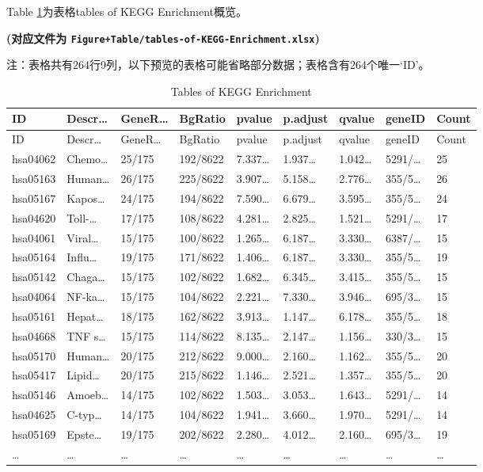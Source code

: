 \documentclass[
]{article}
\begin{document}
Table \ref{tab:tables-of-KEGG-Enrichment}为表格tables of KEGG Enrichment概览。

\textbf{(对应文件为 \texttt{Figure+Table/tables-of-KEGG-Enrichment.xlsx})}

\begin{center}\begin{tcolorbox}[colback=gray!10, colframe=gray!50, width=0.9\linewidth, arc=1mm, boxrule=0.5pt]注：表格共有264行9列，以下预览的表格可能省略部分数据；表格含有264个唯一`ID'。
\end{tcolorbox}
\end{center}

\begin{longtable}[]{@{}lllllllll@{}}
\caption{\label{tab:tables-of-KEGG-Enrichment}Tables of KEGG Enrichment}\tabularnewline
\toprule
ID & Descr\ldots{} & GeneR\ldots{} & BgRatio & pvalue & p.adjust & qvalue & geneID & Count\tabularnewline
\midrule
\endfirsthead
\toprule
ID & Descr\ldots{} & GeneR\ldots{} & BgRatio & pvalue & p.adjust & qvalue & geneID & Count\tabularnewline
\midrule
\endhead
hsa04062 & Chemo\ldots{} & 25/175 & 192/8622 & 7.337\ldots{} & 1.937\ldots{} & 1.042\ldots{} & 5291/\ldots{} & 25\tabularnewline
hsa05163 & Human\ldots{} & 26/175 & 225/8622 & 3.907\ldots{} & 5.158\ldots{} & 2.776\ldots{} & 355/5\ldots{} & 26\tabularnewline
hsa05167 & Kapos\ldots{} & 24/175 & 194/8622 & 7.590\ldots{} & 6.679\ldots{} & 3.595\ldots{} & 355/5\ldots{} & 24\tabularnewline
hsa04620 & Toll-\ldots{} & 17/175 & 108/8622 & 4.281\ldots{} & 2.825\ldots{} & 1.521\ldots{} & 5291/\ldots{} & 17\tabularnewline
hsa04061 & Viral\ldots{} & 15/175 & 100/8622 & 1.265\ldots{} & 6.187\ldots{} & 3.330\ldots{} & 6387/\ldots{} & 15\tabularnewline
hsa05164 & Influ\ldots{} & 19/175 & 171/8622 & 1.406\ldots{} & 6.187\ldots{} & 3.330\ldots{} & 355/5\ldots{} & 19\tabularnewline
hsa05142 & Chaga\ldots{} & 15/175 & 102/8622 & 1.682\ldots{} & 6.345\ldots{} & 3.415\ldots{} & 355/5\ldots{} & 15\tabularnewline
hsa04064 & NF-ka\ldots{} & 15/175 & 104/8622 & 2.221\ldots{} & 7.330\ldots{} & 3.946\ldots{} & 695/3\ldots{} & 15\tabularnewline
hsa05161 & Hepat\ldots{} & 18/175 & 162/8622 & 3.913\ldots{} & 1.147\ldots{} & 6.178\ldots{} & 355/5\ldots{} & 18\tabularnewline
hsa04668 & TNF s\ldots{} & 15/175 & 114/8622 & 8.135\ldots{} & 2.147\ldots{} & 1.156\ldots{} & 330/3\ldots{} & 15\tabularnewline
hsa05170 & Human\ldots{} & 20/175 & 212/8622 & 9.000\ldots{} & 2.160\ldots{} & 1.162\ldots{} & 355/5\ldots{} & 20\tabularnewline
hsa05417 & Lipid\ldots{} & 20/175 & 215/8622 & 1.146\ldots{} & 2.521\ldots{} & 1.357\ldots{} & 355/5\ldots{} & 20\tabularnewline
hsa05146 & Amoeb\ldots{} & 14/175 & 102/8622 & 1.503\ldots{} & 3.053\ldots{} & 1.643\ldots{} & 5291/\ldots{} & 14\tabularnewline
hsa04625 & C-typ\ldots{} & 14/175 & 104/8622 & 1.941\ldots{} & 3.660\ldots{} & 1.970\ldots{} & 5291/\ldots{} & 14\tabularnewline
hsa05169 & Epste\ldots{} & 19/175 & 202/8622 & 2.280\ldots{} & 4.012\ldots{} & 2.160\ldots{} & 695/3\ldots{} & 19\tabularnewline
\ldots{} & \ldots{} & \ldots{} & \ldots{} & \ldots{} & \ldots{} & \ldots{} & \ldots{} & \ldots{}\tabularnewline
\bottomrule
\end{longtable}
\end{document}
